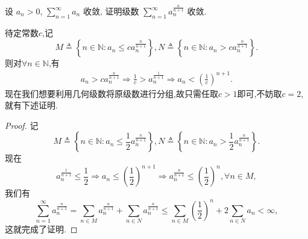 \documentclass[../../main.tex]{subfiles}%
\begin{document}
\begin{example}
设 $a_n > 0$, $\sum_{n=1}^{\infty} a_n$ 收敛, 证明级数 $\sum_{n=1}^{\infty} a_n^{\frac{n}{n + 1}}$ 收敛.
\end{example}
\begin{note}
待定常数$c$,记
\[
M\triangleq \left\{ n\in \mathbb{N} :a_n\leqslant ca_{n}^{\frac{n}{n+1}} \right\} ,N\triangleq \left\{ n\in \mathbb{N} :a_n>ca_{n}^{\frac{n}{n+1}} \right\} .
\]
则对$\forall n\in \mathbb{N}$,有
\begin{align*}
a_n>ca_{n}^{\frac{n}{n+1}}\Rightarrow \frac{1}{c}>a_{n}^{\frac{1}{n+1}} \Rightarrow a_n<\left( \frac{1}{c} \right) ^{n+1}.
\end{align*}
现在我们想要利用几何级数将原级数进行分组,故只需任取$c>1$即可,不妨取$c=2$,就有下述证明.
\end{note}
\begin{proof}

记
\[
M \triangleq \left\{ n \in \mathbb{N} : a_n \leqslant \frac{1}{2} a_n^{\frac{n}{n + 1}} \right\}, N \triangleq \left\{ n \in \mathbb{N} : a_n > \frac{1}{2} a_n^{\frac{n}{n + 1}} \right\}.
\]
现在
\[
a_n^{\frac{1}{n + 1}} \leqslant \frac{1}{2} \Rightarrow a_n \leqslant \left( \frac{1}{2} \right)^{n + 1} \Rightarrow a_n^{\frac{n}{n + 1}} \leqslant \left( \frac{1}{2} \right)^n, \forall n \in M,
\]
我们有
\[
\sum_{n=1}^{\infty} a_n^{\frac{n}{n + 1}} = \sum_{n \in M} a_n^{\frac{n}{n + 1}} + \sum_{n \in N} a_n^{\frac{n}{n + 1}} \leqslant \sum_{n \in M} \left( \frac{1}{2} \right)^n + 2 \sum_{n \in N} a_n < \infty,
\]
这就完成了证明.

\end{proof}
\end{document}
